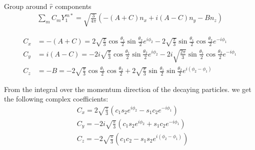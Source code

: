\documentclass[12pt]{article}
\begin{document}
    Group around $\hat{r}$ components
    \[
    \begin{aligned}
    \sum_{m} C_m Y^{m*}_1 = \sqrt{\frac{3}{4 \pi}} \left( -(A+C) n_x + i(A - C) n_y - B n_z \right)
    \end{aligned}
    \]
    
    \[
    \begin{aligned}
    	C_x &=-(A+C)= 2 \sqrt{\frac{\pi}{3}} \cos \frac{\theta_1}{2} \sin \frac{\theta_2}{2} e^{i \phi_2} - 2 \sqrt{\frac{\pi}{3}} \sin \frac{\theta_1}{2} \cos \frac{\theta_2}{2} e^{-i \phi_1} \\
    	C_y &= i(A - C)= -2 i \sqrt{\frac{\pi}{3}} \cos \frac{\theta_1}{2} \sin \frac{\theta_2}{2} e^{i \phi_2} - 2i \sqrt{\frac{2 \pi}{3}} \sin \frac{\theta_1}{2} \cos \frac{\theta_2}{2} e^{-i \phi_1} \\
    	C_z &= -B = -2 \sqrt{\frac{\pi}{3}} \cos \frac{\theta_1}{2} \cos \frac{\theta_2}{2} + 2 \sqrt{\frac{\pi}{3}} \sin \frac{\theta_1}{2} \sin \frac{\theta_2}{2} e^{i(\phi_2 - \phi_1)}
    \end{aligned}
    \]

	From the integral over the momentum direction of the decaying particles. we get the following complex coefficients:
	\[
	\begin{aligned}
		&C_x = 2 \sqrt{\frac{\pi}{3}} \left(c_1 s_2 e^{i \phi_2 } - s_1 c_2 e^{-i \phi_1}\right) \\
		&C_y = -2 i \sqrt{\frac{\pi}{3}} \left(c_1 s_2 e^{i \phi_2} + s_1 c_2 e^{-i \phi_1}\right) \\
		&C_z = -2 \sqrt{\frac{\pi}{3}} \left(c_1 c_2 - s_1 s_2 e^{i(\phi_2 - \phi_1)}\right) \\		
	\end{aligned}
	\]
\end{document}

